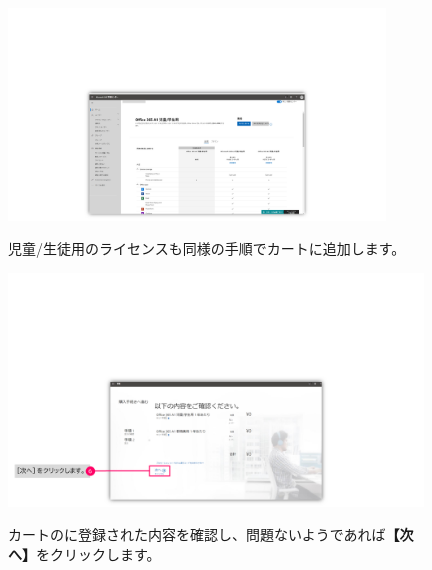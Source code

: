 \begin{figure}[h]
    \begin{minipage}{0.6\textwidth}
        \vspace{-1.4cm}
        \includegraphics[width=10cm]{figures/O365A1_buy02.png}
    \end{minipage}
    \begin{minipage}{0.4\textwidth}
        児童/生徒用のライセンスも同様の手順でカートに追加します。
    \end{minipage}
\end{figure}

\begin{figure}[h]
    \begin{minipage}{0.6\textwidth}
        \vspace{-1.8cm}\hspace{-0.6cm}
        \includegraphics[width=11cm]{figures/O365A1_buy03.png}
    \end{minipage}
    \begin{minipage}{0.4\textwidth}
        カートのに登録された内容を確認し、問題ないようであれば\textbf{【次へ】}をクリックします。
    \end{minipage}
\end{figure}


